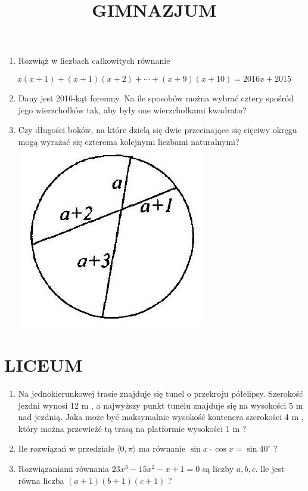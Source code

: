 \documentclass[10pt]{article}
\title{GIMNAZJUM }
\author{}
\date{}
\begin{document}
\maketitle
\begin{enumerate}
  \item Rozwiąż w liczbach całkowitych równanie
\end{enumerate}

\[
x(x+1)+(x+1)(x+2)+\cdots+(x+9)(x+10)=2016 x+2015
\]

\begin{enumerate}
  \setcounter{enumi}{1}
  \item Dany jest 2016-kąt foremny. Na ile sposobów można wybrać cztery spośród jego wierzchołków tak, aby były one wierzchołkami kwadratu?
  \item Czy długości boków, na które dzielą się dwie przecinające się cięciwy okręgu mogą wyrażać się czterema kolejnymi liczbami naturalnymi?\\
\includegraphics[max width=\textwidth, center]{2024_11_21_93cdd7e5dcdd6a9af56eg-1}
\end{enumerate}

\section*{LICEUM}
\begin{enumerate}
  \item Na jednokierunkowej trasie znajduje się tunel o przekroju półelipsy. Szerokość jezdni wynosi 12 m , a najwyższy punkt tunelu znajduje się na wysokości 5 m nad jezdnią. Jaka może być maksymalnie wysokość kontenera szerokości 4 m , który można przewieźć tą trasą na platformie wysokości 1 m ?
  \item Ile rozwiązań w przedziale \(\langle 0, \pi\rangle\) ma równanie \(\sin x \cdot \cos x=\sin 40^{\circ}\) ?
  \item Rozwiązaniami równania \(23 x^{3}-15 x^{2}-x+1=0\) są liczby \(a, b, c\). lle jest równa liczba \((a+1)(b+1)(c+1)\) ?
\end{enumerate}
\end{document}
